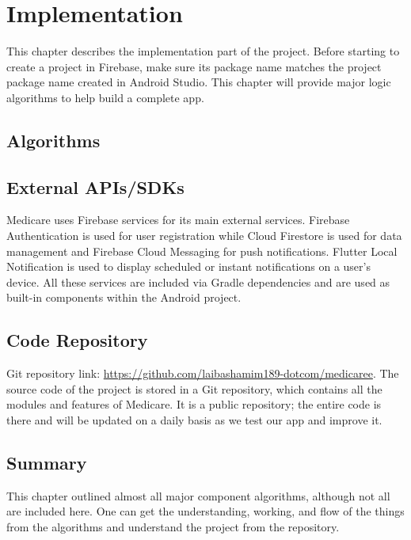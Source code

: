 \chapter{Implementation}
\label{ch:implementation}

This chapter describes the implementation part of the project. Before starting to create a project in Firebase, make sure its package name matches the project package name created in Android Studio. This chapter will provide major logic algorithms to help build a complete app.

\section{Algorithms}



\section{External APIs/SDKs}

Medicare uses Firebase services for its main external services. Firebase Authentication is used for user registration while Cloud Firestore is used for data management and Firebase Cloud Messaging for push notifications. Flutter Local Notification is used to display scheduled or instant notifications on a user's device. All these services are included via Gradle dependencies and are used as built-in components within the Android project.

\section{Code Repository}

Git repository link: \url{https://github.com/laibashamim189-dotcom/medicaree}. The source code of the project is stored in a Git repository, which contains all the modules and features of Medicare. It is a public repository; the entire code is there and will be updated on a daily basis as we test our app and improve it.

\section{Summary}

This chapter outlined almost all major component algorithms, although not all are included here. One can get the understanding, working, and flow of the things from the algorithms and understand the project from the repository.
